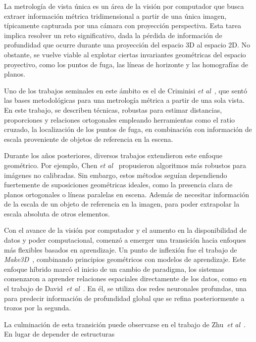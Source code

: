 \par
La metrología de vista única es un área de la visión por computador que busca extraer información métrica
tridimensional a partir de una única imagen, típicamente capturada por una cámara con proyección perspectiva.
Esta tarea implica resolver un reto significativo, dada la pérdida de información de profundidad que ocurre
durante una proyección del espacio 3D al espacio 2D. No obstante, se vuelve viable al explotar ciertas
invariantes geométricas del espacio proyectivo, como los puntos de fuga, las líneas de horizonte y las
homografías de planos.
\par
Uno de los trabajos seminales en este ámbito es el de Criminisi \emph{et al}~\cite{CriminisiReconstruction,CriminisiApplications},
que sentó las bases metodológicas para una metrología métrica a partir de una sola vista. En este trabajo,
se describen técnicas, robustas para estimar distancias, proporciones y relaciones ortogonales empleando herramientas como el
ratio cruzado, la localización de los puntos de fuga, en combinación con información de escala proveniente de objetos de referencia
en la escena.
\par
Durante los años posteriores, diversos trabajos extendieron este enfoque geométrico. Por ejemplo, Chen \emph{et al}~\cite{Chen2006}
propusieron algoritmos más robustos para imágenes no calibradas. Sin embargo, estos métodos seguían dependiendo fuertemente de
suposiciones geométricas ideales, como la presencia clara de planos ortogonales o líneas paralelas en escena. Además de necesitar
información de la escala de un objeto de referencia en la imagen, para poder extrapolar la escala absoluta de otros elementos.
\par
Con el avance de la visión por computador y el aumento en la disponibilidad de datos y poder computacional, comenzó a emerger una
transición hacia enfoques más flexibles basados en aprendizaje. Un punto de inflexión fue el trabajo de \emph{Make3D}~\cite{Make3D},
combinando principios geométricos con modelos de aprendizaje.  Este enfoque híbrido marcó el inicio de un cambio de paradigma,
los sistemas comenzaron a aprender relaciones espaciales directamente de los datos, como en el trabajo de David~\emph{et al}~\cite{DepthMapMultiScale}.
En él, se utiliza dos redes neuronales profundas, una para predecir información de profundidad global que se refina posteriormente
a trozos por la segunda.
\par
La culminación de esta transición puede observarse en el trabajo de Zhu~\emph{et al}~\cite{SVMIW}. En lugar de depender de estructuras
